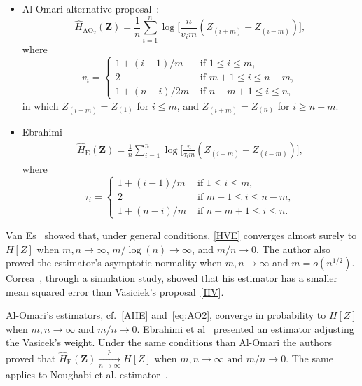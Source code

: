 \documentclass[journal]{IEEEtran}
\begin{document}
\begin{itemize}
	\item Al-Omari alternative proposal~\cite{AlOmari2016}:
	\label{AO2}
	\begin{equation}
		\widehat{H}_{{\text{AO}}_2}(\bm Z)=\frac{1}{n} \sum_{i=1}^{n} \log \Big[\frac{n}{v_{i} m}\left(Z_{(i+m)}-Z_{(i-m)}\right)\Big],
		\label{eq:AO2}
	\end{equation}
	where
	\begin{equation*}
		v_{i}=\begin{cases}
			1+(i-1)/m & \text{ if }1 \leq i \leq m, \\
			2 & \text{ if } m+1 \leq i \leq n-m, \\
			1+(n-i)/2m & \text{ if } n-m+1 \leq i \leq n,
		\end{cases}
	\end{equation*}
	in which $Z_{(i-m)}=Z_{(1)}$ for $i \leq m$, and $Z_{(i+m)}=Z_{(n)}$ for $i \geq n-m$.
	\item Ebrahimi~\cite{Ebrahimi94}
	\begin{align}
		\widehat{H}_\text{E}(\bm Z)=\frac{1}{n} \sum_{i=1}^{n} \log \Big[\frac{n}{\tau_{i} m}\left(Z_{(i+m)}-Z_{(i-m)}\right)\Big],
		\label{HE}
	\end{align}
	where
	\begin{equation*}
		\tau_{i}=\begin{cases}
			1+(i-1)/m & \text{ if }1 \leq i \leq m, \\
			2 & \text{ if } m+1 \leq i \leq n-m, \\
			1+(n-i)/m & \text{ if } n-m+1 \leq i \leq n.
		\end{cases}
	\end{equation*}
\end{itemize}

Van Es~\cite{VanEs92} showed that, under general conditions, \eqref{HVE} converges almost surely to $H[Z]$ when $m, n \to \infty$, $m/\log(n) \to \infty$, and $m/n \to 0$.
The author also proved the estimator's asymptotic normality when $m, n \to \infty$ and $m = o(n^{1/2})$. 
Correa~\cite{Correa95}, through a simulation study, showed that his estimator has a smaller mean squared error than Vasiciek's  proposal~\eqref{HV}. 

Al-Omari's estimators, cf.~\eqref{AHE} and~\eqref{eq:AO2}, converge in probability to $ H[Z]$ when $m, n \to \infty  \text{ and } m/n \to 0$. 
Ebrahimi et al~\cite{Ebrahimi94} presented an estimator adjusting the Vasicek's\cite{Vasicek76} weight. 
Under the same conditions than Al-Omari\cite{AlOmari2014} the authors proved that $\widehat{H}_{\text{E}}(\bm Z)\underset{n \to \infty}{\overset{p}{\longrightarrow}} H[Z]$ when $m, n \to \infty  \text{ and } m/n \to 0$. 
The same applies to Noughabi et al. estimator~\cite{Noughabi2010}.
\end{document}

